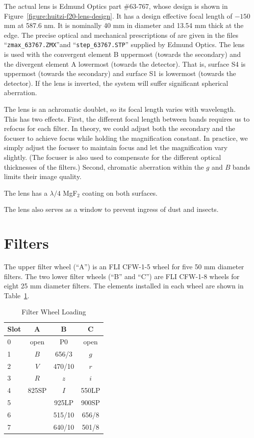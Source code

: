 The actual lens is Edmund Optics part \#63-767, whose design is shown in Figure~\ref{figure:huitzi-f20-lens-design}. It has a design effective focal length of $-150$ mm at 587.6 nm. It is nominally 40 mm in diameter and 13.54 mm thick at the edge. The precise optical and mechanical prescriptions of are given in the files “\verb|zmax_63767.ZMX|”and “\verb|step_63767.STP|” supplied by Edmund Optics. The lens is used with the convergent element B uppermost (towards the secondary) and the divergent element A lowermost (towards the detector). That is, surface S4 is uppermost (towards the secondary) and surface S1 is lowermost (towards the detector). If the lens is inverted, the system will suffer significant spherical aberration.

The lens is an achromatic doublet, so its focal length varies with wavelength. This has two effects. First, the different focal length between bands requires us to refocus for each filter. In theory, we could adjust both the secondary and the focuser to achieve focus while holding the magnification constant. In practice, we simply adjust the focuser to maintain focus and let the magnification vary slightly. (The focuser is also used to compensate for the different optical thicknesses of the filters.) Second, chromatic aberration within the $g$ and $B$ bands limits their image quality.

The lens has a $\lambda/4$ MgF$_2$ coating on both surfaces.

The lens also serves as a window to prevent ingress of dust and insects.

\section{Filters}

The upper filter wheel (“A”) is an FLI CFW-1-5 wheel for five 50 mm diameter filters. The two lower filter wheels (“B” and “C”) are FLI CFW-1-8 wheels for eight 25 mm diameter filters. The elements installed in each wheel are shown in Table~\ref{table:huitzi-f20-filter-wheel-loading}.

\begin{table}
\begin{center}
\caption{Filter Wheel Loading}
\label{table:huitzi-f20-filter-wheel-loading}
\medskip
\begin{tabular}{lccc}
\hline
Slot&A&B&C\\
\hline
0&open	&P0			&open		\\
1&$B$	&656/3		&$g$		\\
2&$V$	&470/10		&$r$		\\
3&$R$	&$z$			&$i$		\\
4&825SP	&$I$			&550LP	\\
5&			&925LP		&900SP	\\
6&			&515/10		&656/8	\\
7&			&640/10		&501/8	\\
\hline
\end{tabular}
\end{center}
\end{table}

